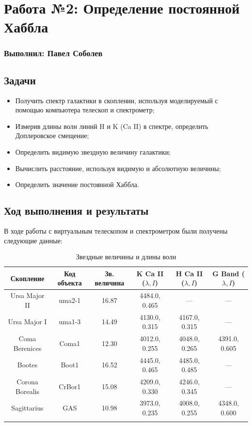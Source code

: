 \documentclass[a4paper, oneside]{article}
\begin{document}
\section*{Работа №2: Определение постоянной Хаббла}
\subsubsection*{Выполнил: Павел Соболев}

\vspace{3em}

\subsection*{Задачи}

\begin{itemize}
  \setlength\itemsep{-0.1em}
  \item Получить спектр галактики в скоплении, используя моделируемый с помощью компьютера телескоп и спектрометр;
  \item Измерив длины волн линий H и K (Ca II) в спектре, определить Доплеровское смещение;
  \item Определить видимую звездную величину галактики;
  \item Вычислить расстояние, используя видимую и абсолютную величины;
  \item Определить значение постоянной Хаббла.
\end{itemize}

\subsection*{Ход выполнения и результаты}

В ходе работы с виртуальным телескопом и спектрометром были получены следующие данные:

\begin{table}[h]
  \centering
  \caption{Звездные величины и длины волн}
  \begin{tabular}{cccccc}
    \toprule
    Скопление &
    Код объекта &
    Зв. величина &
    K Ca II ($ \lambda, I $) &
    H Ca II ($ \lambda, I $) &
    G Band ($ \lambda, I $) \\
    \midrule
    Ursa Major II & uma2-1 & 16.87 & 4484.0, 0.465 & --- & --- \\
    \arrayrulecolor{black!40}
    \midrule
    Ursa Major I & uma1-3 & 14.49 & 4130.0, 0.315 & 4167.0, 0.315 & --- \\
    \midrule
    Coma Berenices & Coma1 & 12.30 & 4012.0, 0.255 & 4048.0, 0.265 & 4391.0, 0.605 \\
    \midrule
    Bootes & Boot1 & 16.52 & 4445.0, 0.465 & 4485.0, 0.485 & --- \\
    \midrule
    Corona Borealis & CrBor1 & 15.08 & 4209.0, 0.330 & 4246.0, 0.345 & --- \\
    \midrule
    Sagittarius & GAS & 10.98 & 3973.0, 0.235 & 4008.0, 0.255 & 4348.0, 0.600 \\
    \arrayrulecolor{black}
    \bottomrule
  \end{tabular}
\end{table}
\end{document}
